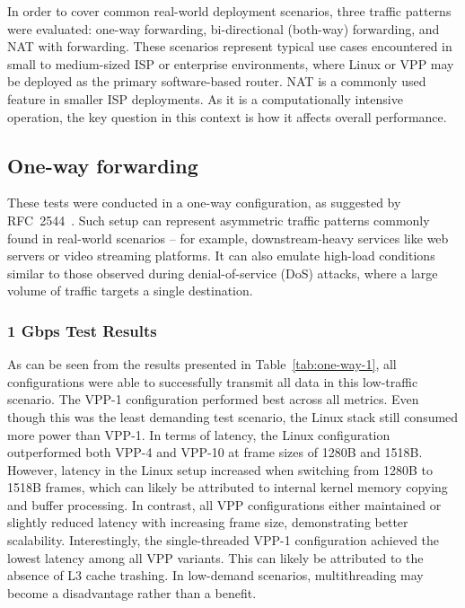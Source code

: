 In order to cover common real-world deployment scenarios, three traffic patterns were evaluated: one-way forwarding, bi-directional (both-way) forwarding, and NAT with forwarding.
These scenarios represent typical use cases encountered in small to medium-sized ISP or enterprise environments, where Linux or VPP may be deployed as the primary software-based router.
NAT is a commonly used feature in smaller ISP deployments. As it is a computationally intensive operation, the key question in this context is how it affects overall performance.

\subsection{One-way forwarding}

These tests were conducted in a one-way configuration, as suggested by RFC~2544~\cite{rfc2544}.
Such setup can represent asymmetric traffic patterns commonly found in real-world scenarios -- for example, downstream-heavy services like web servers or video streaming platforms.
It can also emulate high-load conditions similar to those observed during denial-of-service (DoS) attacks, where a large volume of traffic targets a single destination. 

\subsubsection{1 Gbps Test Results}

As can be seen from the results presented in Table~\ref{tab:one-way-1}, all configurations were able to successfully transmit all data in this low-traffic scenario.
The VPP-1 configuration performed best across all metrics. Even though this was the least demanding test scenario, the Linux stack still consumed more power than VPP-1.
In terms of latency, the Linux configuration outperformed both VPP-4 and VPP-10 at frame sizes of 1280B and 1518B.
However, latency in the Linux setup increased when switching from 1280B to 1518B frames, which can likely be attributed to internal kernel memory copying and buffer processing.
In contrast, all VPP configurations either maintained or slightly reduced latency with increasing frame size, demonstrating better scalability.
Interestingly, the single-threaded VPP-1 configuration achieved the lowest latency among all VPP variants.
This can likely be attributed to the absence of L3 cache trashing. In low-demand scenarios, multithreading may become a disadvantage rather than a benefit.

